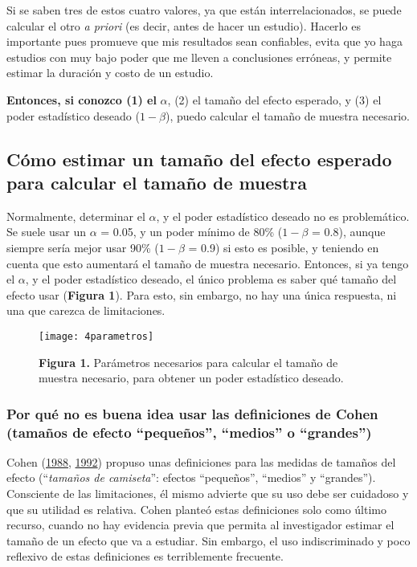 \documentclass[
]{article}
\begin{document}
Si se saben tres de estos cuatro valores, ya que están
interrelacionados, se puede calcular el otro \emph{a priori} (es decir,
antes de hacer un estudio). Hacerlo es importante pues promueve que mis
resultados sean confiables, evita que yo haga estudios con muy bajo
poder que me lleven a conclusiones erróneas, y permite estimar la
duración y costo de un estudio.

\textcolor{red}{\faBookmark} \textbf{Entonces, si conozco (1) el}
\(\alpha\), (2) el tamaño del efecto esperado, y (3) el poder
estadístico deseado (\(1-\beta\)), puedo calcular el tamaño de muestra
necesario.

\hypertarget{cuxf3mo-estimar-un-tamauxf1o-del-efecto-esperado-para-calcular-el-tamauxf1o-de-muestra}{%
\subsection{Cómo estimar un tamaño del efecto esperado para calcular el
tamaño de
muestra}\label{cuxf3mo-estimar-un-tamauxf1o-del-efecto-esperado-para-calcular-el-tamauxf1o-de-muestra}}

Normalmente, determinar el \(\alpha\), y el poder estadístico deseado no
es problemático. Se suele usar un \(\alpha\) = 0.05, y un poder mínimo
de 80\% (\(1-\beta\) = 0.8), aunque siempre sería mejor usar 90\%
(\(1-\beta\) = 0.9) si esto es posible, y teniendo en cuenta que esto
aumentará el tamaño de muestra necesario. Entonces, si ya tengo el
\(\alpha\), y el poder estadístico deseado, el único problema es saber
qué tamaño del efecto usar (\textbf{Figura 1}). Para esto, sin embargo,
no hay una única respuesta, ni una que carezca de limitaciones.

\begin{figure}[h]

{\centering \texttt{[image: 4parametros]} 

}

\caption{\textbf{Figura 1.} Parámetros necesarios para calcular el tamaño de muestra necesario, para obtener un poder estadístico deseado.}\label{fig:fig1}
\end{figure}

\hypertarget{probs}{%
\subsubsection{Por qué no es buena idea usar las definiciones de Cohen
(tamaños de efecto ``pequeños'', ``medios'' o
``grandes'')}\label{probs}}

Cohen (\protect\hyperlink{ref-cohenStatisticalPowerAnalysis1988}{1988},
\protect\hyperlink{ref-cohenPowerPrimer1992}{1992}) propuso unas
definiciones para las medidas de tamaños del efecto (``\emph{tamaños de
camiseta}'': efectos ``pequeños'', ``medios'' y ``grandes''). Consciente
de las limitaciones, él mismo advierte que su uso debe ser cuidadoso y
que su utilidad es relativa. Cohen planteó estas definiciones solo como
último recurso, cuando no hay evidencia previa que permita al
investigador estimar el tamaño de un efecto que va a estudiar. Sin
embargo, el uso indiscriminado y poco reflexivo de estas definiciones es
terriblemente frecuente.
\end{document}
